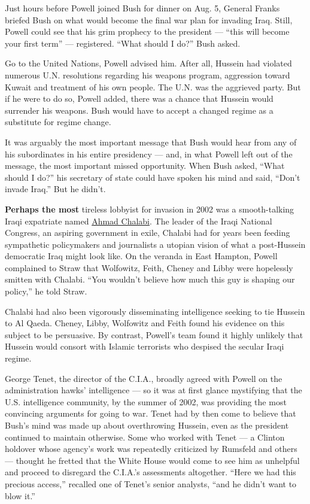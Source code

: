 Just hours before Powell joined Bush for dinner on Aug. 5, General
Franks briefed Bush on what would become the final war plan for invading
Iraq. Still, Powell could see that his grim prophecy to the president
--- ``this will become your first term'' --- registered. ``What should I
do?'' Bush asked.

Go to the United Nations, Powell advised him. After all, Hussein had
violated numerous U.N. resolutions regarding his weapons program,
aggression toward Kuwait and treatment of his own people. The U.N. was
the aggrieved party. But if he were to do so, Powell added, there was a
chance that Hussein would surrender his weapons. Bush would have to
accept a changed regime as a substitute for regime change.

It was arguably the most important message that Bush would hear from any
of his subordinates in his entire presidency --- and, in what Powell
left out of the message, the most important missed opportunity. When
Bush asked, ``What should I do?'' his secretary of state could have
spoken his mind and said, ``Don't invade Iraq.'' But he didn't.

\textbf{Perhaps the most} tireless lobbyist for invasion in 2002 was a
smooth-talking Iraqi expatriate named
\href{https://www.nytimes.com/2015/11/04/world/middleeast/ahmad-chalabi-iraq-dead.html}{Ahmad
Chalabi}. The leader of the Iraqi National Congress, an aspiring
government in exile, Chalabi had for years been feeding sympathetic
policymakers and journalists a utopian vision of what a post-Hussein
democratic Iraq might look like. On the veranda in East Hampton, Powell
complained to Straw that Wolfowitz, Feith, Cheney and Libby were
hopelessly smitten with Chalabi. ``You wouldn't believe how much this
guy is shaping our policy,'' he told Straw.

Chalabi had also been vigorously disseminating intelligence seeking to
tie Hussein to Al Qaeda. Cheney, Libby, Wolfowitz and Feith found his
evidence on this subject to be persuasive. By contrast, Powell's team
found it highly unlikely that Hussein would consort with Islamic
terrorists who despised the secular Iraqi regime.

George Tenet, the director of the C.I.A., broadly agreed with Powell on
the administration hawks' intelligence --- so it was at first glance
mystifying that the U.S. intelligence community, by the summer of 2002,
was providing the most convincing arguments for going to war. Tenet had
by then come to believe that Bush's mind was made up about overthrowing
Hussein, even as the president continued to maintain otherwise. Some who
worked with Tenet --- a Clinton holdover whose agency's work was
repeatedly criticized by Rumsfeld and others --- thought he fretted that
the White House would come to see him as unhelpful and proceed to
disregard the C.I.A.'s assessments altogether. ``Here we had this
precious access,'' recalled one of Tenet's senior analysts, ``and he
didn't want to blow it.''


